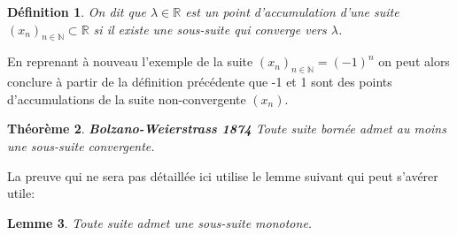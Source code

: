 \documentclass[a4paper, 12pt, french, twoside]{article}
\newtheorem{theorem}{Théorème}[section]
\newtheorem{lemma}[theorem]{Lemme}
\newtheorem{defi}[theorem]{Définition}
\newcommand{\Nn}{{\mathbb{N}}}
\newcommand{\Rr}{{\mathbb{R}}}
\begin{document}
\begin{defi}\label{def422}
On dit que $\lambda \in \Rr $ est un point d'accumulation d'une suite $(x_n)_{n \in \Nn} \subset \Rr$ si il existe une sous-suite qui converge vers $\lambda$.
\end{defi}
En reprenant à nouveau l'exemple de la suite $(x_n)_{n \in \Nn} = (-1)^n$ on peut alors conclure à partir de la définition précédente que -1 et 1 sont des points d'accumulations de la suite non-convergente $(x_n)$.  
 
\begin{theorem}{\textbf{Bolzano-Weierstrass 1874}}
    Toute suite bornée admet au moins une sous-suite convergente. 
\end{theorem}
La preuve qui ne sera pas détaillée ici utilise le lemme suivant qui peut s'avérer utile:

\begin{lemma}
\label{peak point lemma}
    Toute suite admet une sous-suite monotone.
\end{lemma}



    
\end{document}
